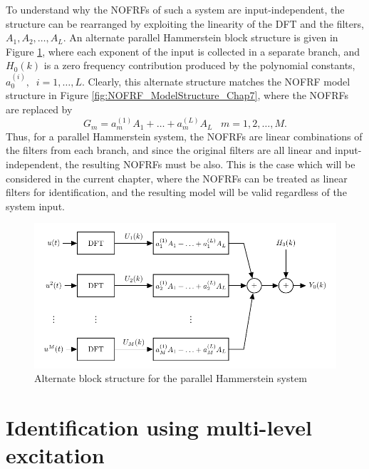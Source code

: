 To understand why the NOFRFs of such a system are input-independent, the structure can be rearranged by exploiting the linearity of the DFT and the filters, $A_1, A_2, \hdots, A_L$. An alternate parallel Hammerstein block structure is given in Figure \ref{fig:AlternateHamm}, where each exponent of the input is collected in a separate branch, and $H_0(k)$ is a zero frequency contribution produced by the polynomial constants, $a_0^{(i)}, \; \; i = 1,\hdots,L$.  Clearly, this alternate structure matches the NOFRF model structure in Figure \ref{fig:NOFRF_ModelStructure_Chap7}, where the NOFRFs are replaced by 
\begin{equation}
G_m = a_m^{(1)}A_1 + \hdots + a_m^{(L)}A_L \; \; \; m = 1,2,\hdots,M.
\end{equation} 
Thus, for a parallel Hammerstein system, the NOFRFs are linear combinations of the filters from each branch, and since the original filters are all linear and input-independent, the resulting NOFRFs must be also. This is the case which will be considered in the current chapter, where the NOFRFs can be treated as linear filters for identification, and the resulting model will be valid regardless of the system input. 

\begin{figure}[h]
\centering
\includegraphics[width=\textwidth]{Chapter7_NOFRFs/AlternateParallelHammStructure}
\caption{Alternate block structure for the parallel Hammerstein system}
\label{fig:AlternateHamm}
\end{figure}


\section{Identification using multi-level excitation}
\label{sec:NOFRFS_multilevel}

